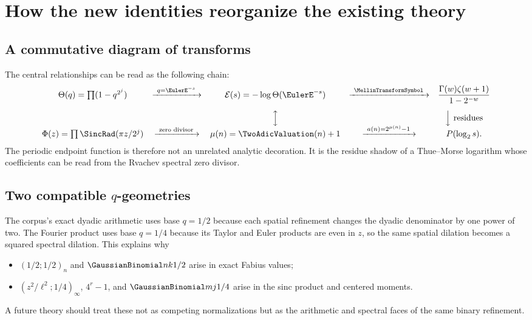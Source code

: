 \documentclass[11pt]{article}
\numberwithin{equation}{section}
\theoremstyle{definition}
\theoremstyle{remark}
\begin{document}
\section{How the new identities reorganize the existing theory}

\subsection{A commutative diagram of transforms}
The central relationships can be read as the following chain:
\[
\begin{array}{ccccc}
 \Theta(q)=\prod(1-q^{2^j})
 &\xrightarrow{\ q=\EulerE^{-s}\ }&
 \mathcal E(s)=-\log\Theta(\EulerE^{-s})
 &\xrightarrow{\ \MellinTransformSymbol\ }&
 \dfrac{\Gamma(w)\zeta(w+1)}{1-2^{-w}}\\[1.2em]
 &&\Big\updownarrow&&\Big\downarrow\text{ residues}\\[-0.2em]
 \Phi(z)=\prod\SincRad(\pi z/2^j)
 &\xrightarrow{\ \text{zero divisor}\ }&
 \mu(n)=\TwoAdicValuation(n)+1
 &\xrightarrow{\ a(n)=2^{\mu(n)}-1\ }&
 P(\log_2s).
\end{array}
\]
The periodic endpoint function is therefore not an unrelated analytic decoration.  It is
the residue shadow of a Thue--Morse logarithm whose coefficients can be read from the
Rvachev spectral zero divisor.

\subsection{Two compatible $q$-geometries}
The corpus's exact dyadic arithmetic uses base $q=1/2$ because each spatial refinement
changes the dyadic denominator by one power of two.  The Fourier product uses base
$q=1/4$ because its Taylor and Euler products are even in $z$, so the same spatial
dilation becomes a squared spectral dilation.  This explains why
\begin{itemize}
\item $(1/2;1/2)_n$ and $\GaussianBinomial nk{1/2}$ arise in exact Fabius values;
\item $(z^2/\ell^2;1/4)_\infty$, $4^r-1$, and
$\GaussianBinomial mj{1/4}$ arise in the sinc product and centered moments.
\end{itemize}
A future theory should treat these not as competing normalizations but as the arithmetic
and spectral faces of the same binary refinement.
\end{document}
